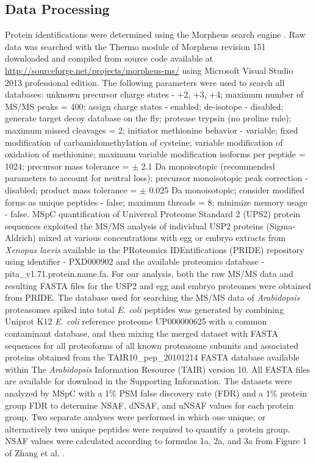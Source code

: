 \subsection{Data Processing}

Protein identifications were determined using the Morpheus search engine \citep{wenger13}.  Raw data was searched with the Thermo module of Morpheus revision 151 downloaded and compiled from source code available at \url{http://sourceforge.net/projects/morpheus-ms/} using Microsoft Visual Studio 2013 professional edition.  The following parameters were used to search all databases: unknown precursor charge states - +2, +3, +4; maximum number of MS/MS peaks = 400; assign charge states - enabled; de-isotope - disabled; generate target decoy database on the fly; protease trypsin (no proline rule); maximum missed cleavages = 2; initiator methionine behavior - variable; fixed modification of carbamidomethylation of cysteine; variable modification of oxidation of methionine; maximum variable modification isoforms per peptide = 1024; precursor mass tolerance = $\pm$ 2.1 Da monoisotopic (recommended parameters to account for neutral loss); precursor monoisotopic peak correction - disabled; product mass tolerance = $\pm$ 0.025 Da monoisotopic; consider modified forms as unique peptides - false; maximum threads = 8; minimize memory usage - false.   
MSpC quantification of Universal Proteome Standard 2 (UPS2) protein sequences exploited the MS/MS analysis of individual USP2 proteins (Sigma-Aldrich) mixed at various concentrations with egg or embryo extracts from \textit{Xenopus laevis} available in the PRoteomics IDEntifications (PRIDE) repository \citep{vizcaino13} using identifier - PXD000902 and the available proteomics database - pita\_v1.71.protein.name.fa.  For our analysis, both the raw MS/MS data and resulting FASTA files for the USP2 and egg and embryo proteomes were obtained from PRIDE.  The database used for searching the MS/MS data of \textit{Arabidopsis} proteasomes spiked into total \textit{E. coli} peptides was generated by combining Uniprot K12 \textit{E. coli} reference proteome UP000000625 with a common contaminant database, and then mixing the merged dataset with FASTA sequences for all proteoforms of all known proteasome subunits and associated proteins \citep{book10} obtained from the TAIR10\_pep\_20101214 FASTA database available within The \textit{Arabidopsis} Information Resource (TAIR) version 10.  All FASTA files are available for download in the Supporting Information.  The datasets were analyzed by MSpC with a 1\% PSM false discovery rate (FDR) and a 1\% protein group FDR to determine NSAF, dNSAF, and uNSAF values for each protein group. Two separate analyses were performed in which one unique, or alternatively two unique peptides were required to quantify a protein group.  NSAF values were calculated according to formulas 1a, 2a, and 3a from Figure 1 of Zhang et al. \citep{zhang10}.

